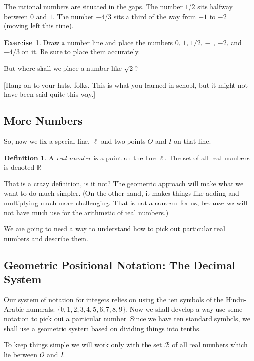 \documentclass[12pt,letterpaper]{article}
\theoremstyle{definition}
\newtheorem{exercise}[question]{Exercise}
\newtheorem*{definition}{Definition}
\begin{document}
The rational numbers are situated in the gaps.
The number $1/2$ sits halfway between $0$ and $1$.
The number $-4/3$ sits a third of the way from $-1$ to $-2$ (moving left this time).

\begin{exercise}
Draw a number line and place the numbers $0$, $1$, $1/2$, $-1$, $-2$, and $-4/3$ on it.
Be sure to place them accurately.
\end{exercise}

But where shall we place a number like $\sqrt{2}$?

[Hang on to your hats, folks.
This is what you learned in school, but it might not have been said quite this way.]

\subsection*{More Numbers}

So, now we fix a special line, $\ell$ and two points $O$ and $I$ on that line.

\begin{definition}
A \emph{real number} is a point on the line $\ell$.
The set of all real numbers is denoted $\mathbb{R}$.
\end{definition}

That is a crazy definition, is it not?
The geometric approach will make what we want to do much simpler.
(On the other hand, it makes things like adding and multiplying much more challenging. 
That is not a concern for us, because we will not have much use for the arithmetic of real numbers.)

We are going to need a way to understand how to pick out particular real numbers and describe them.

\subsection*{Geometric Positional Notation: The Decimal System}

Our system of notation for integers relies on using the ten symbols of the Hindu-Arabic numerals: $\{0, 1, 2, 3, 4, 5, 6, 7, 8, 9\}$.
Now we shall develop a way use some notation to pick out a particular number.
Since we have ten standard symbols, we shall use a geometric system based on dividing things into tenths.

To keep things simple we will work only with the set $\mathcal{R}$ of all real numbers which lie between $O$ and $I$.
\end{document}
